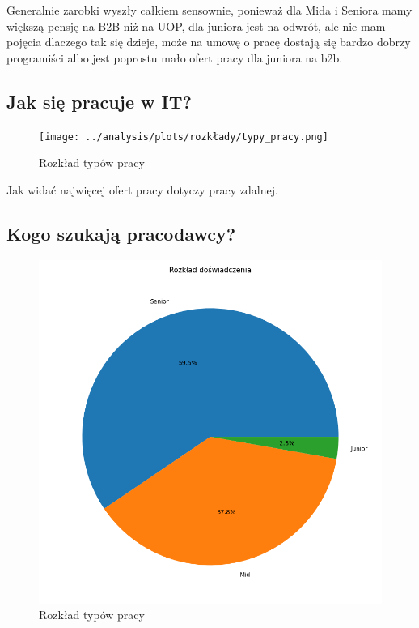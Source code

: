 \documentclass[a4paper]{article}
\begin{document}
\quad Generalnie zarobki wyszły całkiem sensownie,
ponieważ dla Mida i Seniora mamy większą pensję na B2B niż na UOP, dla juniora jest na odwrót, ale nie mam pojęcia dlaczego tak się
dzieje, może na umowę o pracę dostają się bardzo dobrzy programiści albo jest poprostu mało ofert pracy dla juniora na b2b.


\newpage
\subsection{Jak się pracuje w IT?}

\begin{figure}[H]
    \centering
    \texttt{[image: ../analysis/plots/rozkłady/typy\_pracy.png]}
    \caption{Rozkład typów pracy}
\end{figure}

\quad Jak widać najwięcej ofert pracy dotyczy pracy zdalnej.


\subsection{Kogo szukają pracodawcy?}

\begin{figure}[H]
    \centering
    \includegraphics[width=\textwidth]{../analysis/plots/rozkłady/rozkład_doświadczenia.png}
    \caption{Rozkład typów pracy}
\end{figure}
\end{document}

